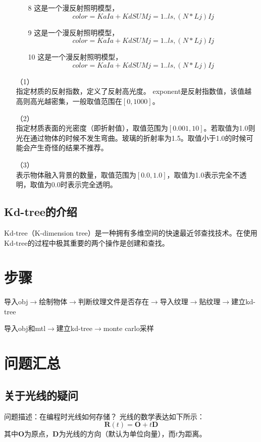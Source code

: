 \documentclass[10pt]{article}
\begin{document}
\begin{itemize}
\begin{itemize}
\item[8]{这是一个漫反射照明模型，}
$$color=KaIa+ Kd { SUM j=1..ls, (N * Lj)Ij }$$

\item[9]{这是一个漫反射照明模型，}
$$color=KaIa+ Kd { SUM j=1..ls, (N * Lj)Ij }$$

\item[10]{ 这是一个漫反射照明模型，}
$$color=KaIa+ Kd { SUM j=1..ls, (N * Lj)Ij }$$
\end{itemize}


\item[（1）]{}\\
指定材质的反射指数，定义了反射高光度。 exponent是反射指数值，该值越高则高光越密集，一般取值范围在$[0,1000]$。 

\item[（2）]{} \\
指定材质表面的光密度（即折射值），取值范围为$[0.001,10]$。若取值为1.0则光在通过物体的时候不发生弯曲。玻璃的折射率为1.5。取值小于1.0的时候可能会产生奇怪的结果不推荐。

\item[（3）]{}\\
表示物体融入背景的数量，取值范围为$[0.0,1.0]$，取值为1.0表示完全不透明，取值为0.0时表示完全透明。
\end{itemize}

\subsection{Kd-tree的介绍}
Kd-tree（K-dimension tree）是一种拥有多维空间的快速最近邻查找技术。在使用Kd-tree的过程中极其重要的两个操作是创建和查找。

\section{步骤}
导入obj$\to$绘制物体$\to$判断纹理文件是否存在$\to$导入纹理$\to$贴纹理$\to$建立kd-tree

导入obj和mtl$\to$建立kd-tree$\to$monte carlo采样

\section{问题汇总}
\subsection{关于光线的疑问}
问题描述：在编程时光线如何存储？
光线的数学表达如下所示：
$$\bm{R}(t)=\bm{O}+t\bm{D}$$
其中$\bm{O}$为原点，$\bm{D}$为光线的方向（默认为单位向量），而$t$为距离。
\end{document}
